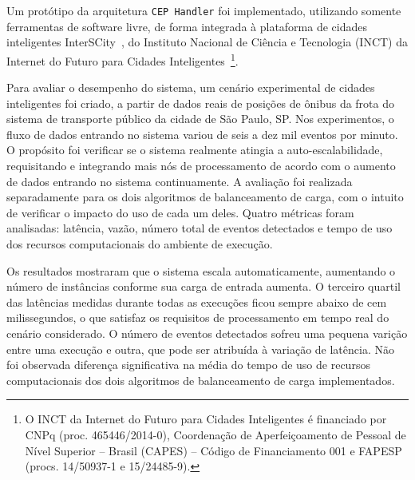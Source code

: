 Um protótipo da arquitetura \texttt{CEP Handler} foi implementado, utilizando somente ferramentas de software livre, de forma integrada à plataforma de cidades inteligentes InterSCity~\citep{del2019design}, do Instituto Nacional de Ciência e Tecnologia (INCT) da Internet do Futuro para Cidades Inteligentes~\citep{Interscitysite}\footnote{O INCT da Internet do Futuro para Cidades Inteligentes é financiado por CNPq (proc. 465446/2014-0), Coordenação de Aperfeiçoamento de Pessoal de Nível Superior – Brasil (CAPES) – Código de Financiamento 001 e FAPESP (procs. 14/50937-1 e 15/24485-9).}. 



Para avaliar o desempenho do sistema, um cenário experimental de cidades inteligentes foi criado, a partir de dados reais de posições de ônibus da frota do sistema de transporte público da cidade de São Paulo, SP.
Nos experimentos, o fluxo de dados entrando no sistema variou de seis a dez mil eventos por minuto. O propósito foi verificar se o sistema realmente atingia a auto-escalabilidade, requisitando e integrando mais nós de processamento de acordo com o aumento de dados entrando no sistema continuamente. A avaliação foi realizada separadamente para os dois algoritmos de balanceamento de carga, com o intuito de verificar o impacto do uso de cada um deles. 
Quatro métricas foram analisadas: latência, vazão, número total de eventos detectados e tempo de uso dos recursos computacionais do ambiente de execução. 

Os resultados mostraram que o sistema escala automaticamente, aumentando o número de instâncias conforme sua carga de entrada aumenta. O terceiro quartil das latências medidas durante todas as execuções ficou sempre abaixo de cem milissegundos, o que satisfaz os requisitos de processamento em tempo real do cenário considerado. O número de eventos detectados sofreu uma pequena varição entre uma execução e outra, que pode ser atribuída à variação de latência. 
Não foi observada diferença significativa na média do tempo de uso de recursos computacionais dos dois algoritmos de balanceamento de
carga implementados.





